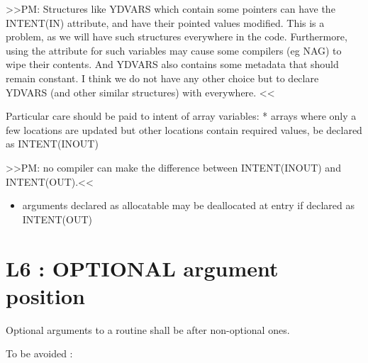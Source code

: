 \documentclass[letterpaper,10pt,english]{sphinxmanual}
\begin{document}
\textgreater{}\textgreater{}PM: Structures like YDVARS which contain some pointers can have the INTENT(IN) attribute, and
have their pointed values modified. This is a problem, as we will have such structures everywhere
in the code.
Furthermore, using the  attribute for such variables may cause some compilers
(eg NAG) to wipe their contents.
And YDVARS also contains some metadata that should remain constant. I think we do not have any
other choice but to declare YDVARS (and other similar structures) with  everywhere.
\textless{}\textless{}

Particular care should be paid to intent of array variables:
* arrays where only a few locations are updated but other locations
contain required values,  be declared as INTENT(INOUT)

\textgreater{}\textgreater{}PM: no compiler can make the difference between INTENT(INOUT) and INTENT(OUT).\textless{}\textless{}
\begin{itemize}
\item {} 
arguments declared as allocatable may be deallocated at entry if declared as INTENT(OUT)

\end{itemize}


\section{L6 : OPTIONAL argument position}
\label{\detokenize{rules/L6:l6-optional-argument-position}}\label{\detokenize{rules/L6::doc}}
Optional arguments to a routine shall be after non-optional ones.

To be avoided :
\def\sphinxLiteralBlockLabel{\label{\detokenize{rules/L6:id1}}}
\begin{sphinxVerbatim}[commandchars=\\\{\}]
   

            
   
           
\end{sphinxVerbatim}
\end{document}
